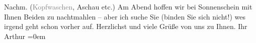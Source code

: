 \begin{ledgroupsized}[t]{13cm}
                  Nachm. (\textcolor{gray}{Kopfwaschen}, Aschau etc.) Am Abend hoffen wir bei Sonnenschein mit Ihnen Beiden zu nachtmahlen – aber ich suche Sie (binden Sie sich nicht!) {\pb}we{\geminationn}s irgend geht schon
               vorher auf. Herzlichst und viele Grüße von uns zu Ihnen.\pend
           \pstart
           Ihr{\\[\baselineskip]}\spacefill\mbox{Arthur}\pend
           \leftskip=0em{}
         
         \endnumbering{}\end{ledgroupsized}  \newcommand{\dateiname}{L02235}\newcommand{\titel}{Arthur Schnitzler an Richard Beer-Hofmann, 30. 7. 1916}\newcommand{\editorInnen}{Martin Anton Müller und Gerd-Hermann Susen}
      